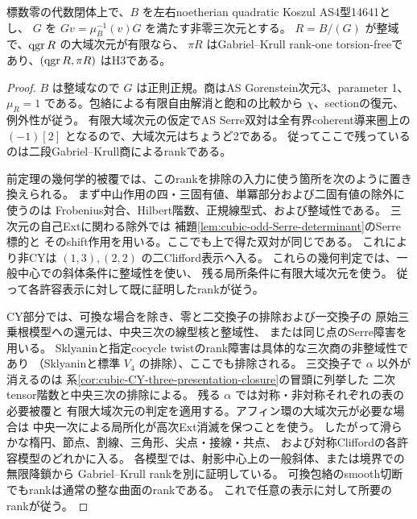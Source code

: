 \begin{corollary}\label{cor:h3-rank-from-classified-smooth-domain}
標数零の代数閉体上で、$B$ を左右noetherian quadratic Koszul AS4型14641とし、
$G$ を $Gv=\mu_B^{-1}(v)G$ を満たす非零三次元とする。
$R=B/(G)$ が整域で、$\operatorname{qgr} R$ の大域次元が有限なら、
$\pi R$ はGabriel--Krull rank-one torsion-freeであり、$(\operatorname{qgr} R,\pi R)$ はH3である。
\end{corollary}
\begin{proof}
$B$ は整域なので $G$ は正則正規。商はAS Gorenstein次元3、parameter 1、
$\mu_R=1$ である。包絡による有限自由解消と飽和の比較から
$\chi$、sectionの復元、例外性が従う。
有限大域次元の仮定でAS Serre双対は全有界coherent導来圏上の
$(-1)[2]$ となるので、大域次元はちょうど2である。
従ってここで残っているのは二段Gabriel--Krull商によるrankである。

前定理の幾何学的被覆では、このrankを排除の入力に使う箇所を次のように置き換えられる。
まず中山作用の四・三固有値、単冪部分および二固有値の除外に使うのは
Frobenius対合、Hilbert階数、正規線型式、および整域性である。
三次元の自己Extに関わる除外では
補題\ref{lem:cubic-odd-Serre-determinant}のSerre標的と
そのshift作用を用いる。ここでも上で得た双対が同じである。
これにより非CYは $(1,3),(2,2)$ の二Clifford表示へ入る。
これらの幾何判定では、一般中心での斜体条件に整域性を使い、
残る局所条件に有限大域次元を使う。
従って各許容表示に対して既に証明したrankが従う。

CY部分では、可換な場合を除き、零と二交換子の排除および一交換子の
原始三乗根模型への還元は、中央三次の線型核と整域性、
または同じ点のSerre障害を用いる。
Sklyaninと指定cocycle twistのrank障害は具体的な三次商の非整域性であり
（Sklyaninと標準 $V_4$ の排除）、ここでも排除される。
三交換子で $\alpha$ 以外が消えるのは
系\ref{cor:cubic-CY-three-presentation-closure}の冒頭に列挙した
二次tensor階数と中央三次の排除による。
残る $\alpha$ では対称・非対称それぞれの表の必要被覆と
有限大域次元の判定を適用する。アフィン環の大域次元が必要な場合は
中央一次による局所化が高次Ext消滅を保つことを使う。
したがって滑らかな楕円、節点、割線、三角形、尖点・接線・共点、
および対称Cliffordの各許容模型のどれかに入る。
各模型では、射影中心上の一般斜体、または境界での無限降鎖から
Gabriel--Krull rankを別に証明している。
可換包絡のsmooth切断でもrankは通常の整な曲面のrankである。
これで任意の表示に対して所要のrankが従う。
\end{proof}

